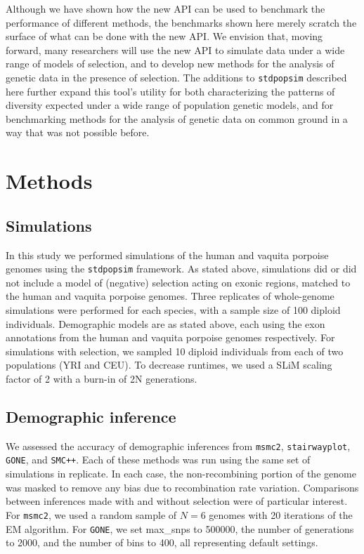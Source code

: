 \documentclass[hidelinks]{article}
\newcommand{\stdpopsim}{\texttt{stdpopsim}\xspace}
\newcommand{\msmc}{\texttt{msmc2}\xspace}
\newcommand{\stairway}{\texttt{stairwayplot}\xspace}
\newcommand{\gone}{\texttt{GONE}\xspace}
\newcommand{\smcpp}{\texttt{SMC++}\xspace}
\begin{document}
    Although we have shown how the new API can be used to benchmark the performance of different methods,
    the benchmarks shown here merely scratch the surface of what can be done with the new API.
    We envision that, moving forward, many researchers will use
    the new API to simulate data under a wide range of models of selection, and to develop
    new methods for the analysis of genetic data in the presence of selection. 
    The additions to \stdpopsim described here further expand this tool's utility for both 
    characterizing the patterns of diversity expected under a wide range of population genetic
    models, and for benchmarking methods for the analysis of genetic data
    on common ground
    in a way that was not possible before.

\section*{Methods}
    \label{methods}

    \subsection*{Simulations}
    In this study we performed simulations of the human and vaquita porpoise genomes
    using the \stdpopsim{} framework. As stated above, simulations did or did not include a model 
    of (negative) selection acting on exonic regions, matched to the human and vaquita porpoise genomes.
    Three replicates of whole-genome simulations were performed for each species, with 
    a sample size of 100 diploid individuals. Demographic models are as stated above, each
    using the exon annotations from the human and vaquita porpoise genomes respectively.
    For simulations with selection, we sampled 10 diploid individuals from each of two populations (YRI and CEU). 
    To decrease runtimes, we used a SLiM scaling factor of 2 with a burn-in of 2N generations. 

    \subsection*{Demographic inference}
    We assessed the accuracy of demographic inferences from
    \msmc \citep{Schiffels2020}, \stairway \citep{liu2020stairway}, \gone \citep{santiago2020recent}, and \smcpp \citep{terhorst2017robust}.
    Each of these methods was run using the same set of simulations in replicate.
    In each case, the non-recombining portion
    of the genome was masked to remove any bias due to recombination rate %
    variation. Comparisons between inferences made with and without selection were 
    of particular interest. For \msmc, we used a random sample of $N=6$ genomes with 20
    iterations of the EM algorithm. For \gone, we set max\_snps to 500000,
    the number of generations to 2000, and the number of bins to 400, all representing default settings.
    
\end{document}
